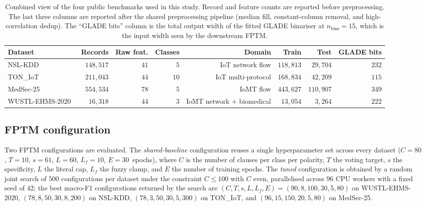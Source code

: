 \documentclass[journal,10pt]{IEEEtran}
\begin{document}
\begin{table}[t]
\caption{Combined view of the four public benchmarks used in this
         study. Record and feature counts are reported before
         preprocessing. The last three columns are reported after the
         shared preprocessing pipeline (median fill, constant-column
         removal, and high-correlation dedup). The ``GLADE bits''
         column is the total output width of the fitted GLADE
         binariser at $n_\text{bins}=15$, which is the input width
         seen by the downstream FPTM.}
\label{tab:datasets}
\centering\small
\begin{tabular}{lrrrrrrr}
\toprule
\textbf{Dataset} & \textbf{Records} & \textbf{Raw feat.} &
\textbf{Classes} & \textbf{Domain} &
\textbf{Train} & \textbf{Test} & \textbf{GLADE bits} \\
\midrule
NSL-KDD~\cite{tavallaee2009nslkdd}       & $148{,}517$ & $41$ & $5$  & IoT network flow             & $118{,}813$ & $29{,}704$  & $232$ \\
TON\_IoT~\cite{moustafa2021ton}          & $211{,}043$ & $44$ & $10$ & IoT multi-protocol           & $168{,}834$ & $42{,}209$  & $115$ \\
MedSec-25                                & $554{,}534$ & $78$ & $5$  & IoMT flow                    & $443{,}627$ & $110{,}907$ & $349$ \\
WUSTL-EHMS-2020~\cite{hady2020wustl}     & $16{,}318$  & $44$ & $3$  & IoMT network $+$ biomedical  & $13{,}054$  & $3{,}264$   & $222$ \\
\bottomrule
\end{tabular}
\end{table}

\subsection{FPTM configuration}
\label{sec:fptm-config}
Two FPTM configurations are evaluated. The \emph{shared-baseline}
configuration reuses a single hyperparameter set across every
dataset ($C{=}80$, $T{=}10$, $s{=}61$, $L{=}60$, $L_f{=}10$,
$E{=}30$~epochs), where $C$ is the number of clauses per class per
polarity, $T$ the voting target, $s$ the specificity, $L$ the
literal cap, $L_f$ the fuzzy clamp, and $E$ the number of training
epochs. The \emph{tuned} configuration is obtained by a random
joint search of $500$ configurations per dataset under the
constraint $C\le 100$ with $C$ even, parallelised across $96$ CPU
workers with a fixed seed of $42$; the best macro-F1 configurations
returned by the search are
$(C,T,s,L,L_f,E)=(90,8,100,30,5,80)$ on WUSTL-EHMS-2020,
$(78,8,50,30,8,200)$ on NSL-KDD,
$(78,3,50,30,5,300)$ on TON\_IoT, and
$(96,15,150,20,5,80)$ on MedSec-25.
\end{document}

